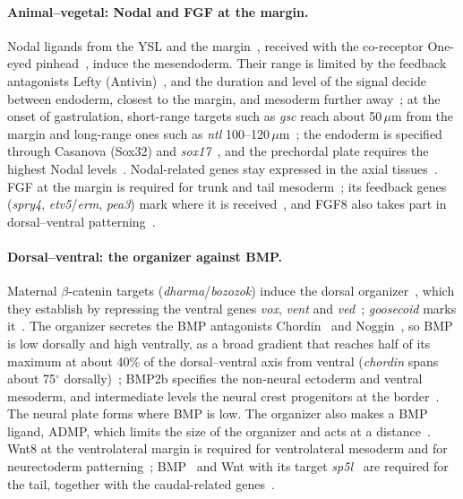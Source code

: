 \documentclass[11pt,a4paper]{article}
\begin{document}
\paragraph{Animal--vegetal: Nodal and FGF at the margin.} Nodal ligands from the YSL and the margin~\cite{erter1998,rodaway1999,feldman1998}, received with the co-receptor One-eyed pinhead~\cite{gritsman1999}, induce the mesendoderm. Their range is limited by the feedback antagonists Lefty (Antivin)~\cite{thisse1999,feldman2002}, and the duration and level of the signal decide between endoderm, closest to the margin, and mesoderm further away~\cite{hagos2007}; at the onset of gastrulation, short-range targets such as \emph{gsc} reach about 50\,$\mu$m from the margin and long-range ones such as \emph{ntl} 100--120\,$\mu$m~\cite{dubrulle2015}; the endoderm is specified through Casanova (Sox32) and \emph{sox17}~\cite{alexander1999,kikuchi2001}, and the prechordal plate requires the highest Nodal levels~\cite{gritsman2000}. Nodal-related genes stay expressed in the axial tissues~\cite{rebagliati1998}. FGF at the margin is required for trunk and tail mesoderm~\cite{griffin1995,draper2003}; its feedback genes (\emph{spry4}, \emph{etv5}/\emph{erm}, \emph{pea3}) mark where it is received~\cite{furthauer2001,raible2001}, and FGF8 also takes part in dorsal--ventral patterning~\cite{furthauer1997}.

\paragraph{Dorsal--ventral: the organizer against BMP.} Maternal $\beta$-catenin targets (\emph{dharma}/\emph{bozozok}) induce the dorsal organizer~\cite{yamanaka1998}, which they establish by repressing the ventral genes \emph{vox}, \emph{vent} and \emph{ved}~\cite{melby2000,shimizu2002}; \emph{goosecoid} marks it~\cite{stachel1993}. The organizer secretes the BMP antagonists Chordin~\cite{hammerschmidt1996,millerbertoglio1997} and Noggin~\cite{furthauer1999}, so BMP is low dorsally and high ventrally, as a broad gradient that reaches half of its maximum at about 40\% of the dorsal--ventral axis from ventral (\emph{chordin} spans about 75$^\circ$ dorsally)~\cite{zinski2017}; BMP2b specifies the non-neural ectoderm and ventral mesoderm, and intermediate levels the neural crest progenitors at the border~\cite{kishimoto1997,nguyen1998,tribulo2003}. The neural plate forms where BMP is low. The organizer also makes a BMP ligand, ADMP, which limits the size of the organizer and acts at a distance~\cite{lele2001,willot2002}. Wnt8 at the ventrolateral margin is required for ventrolateral mesoderm and for neurectoderm patterning~\cite{lekven2001}; BMP~\cite{pyati2005} and Wnt with its target \emph{sp5l}~\cite{thorpe2005} are required for the tail, together with the caudal-related genes~\cite{joly1992,shimizu2005}.
\end{document}
